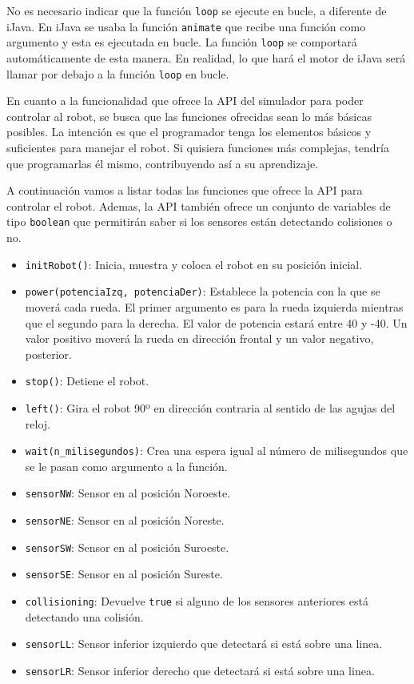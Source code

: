 No es necesario indicar que la función \texttt{loop} se ejecute en bucle, a diferente de iJava. En iJava se usaba la función \texttt{animate} que recibe una función como argumento y esta es ejecutada en bucle. La función \texttt{loop} se comportará automáticamente de esta manera. En realidad, lo que hará el motor de iJava será llamar por debajo a la función \texttt{loop} en bucle.






En cuanto a la funcionalidad que ofrece la API del simulador para poder controlar al robot, se busca que las funciones ofrecidas sean lo más básicas posibles. La intención es que el programador tenga los elementos básicos y suficientes para manejar el robot. Si quisiera funciones más complejas, tendría que programarlas él mismo, contribuyendo así a su aprendizaje. 

A continuación vamos a listar todas las funciones que ofrece la API para controlar el robot. Ademas, la API también ofrece un conjunto de variables de tipo \texttt{boolean} que permitirán saber si los sensores están detectando colisiones o no.

\begin{itemize}
	\item \texttt{initRobot()}: Inicia, muestra y coloca el robot en su posición inicial.
	\item \texttt{power(potenciaIzq, potenciaDer)}: Establece la potencia con la que se moverá cada rueda. El primer argumento es para la rueda izquierda mientras que el segundo para la derecha. El valor de potencia estará entre 40 y -40. Un valor positivo moverá la rueda en dirección frontal y un valor negativo, posterior.
	\item \texttt{stop()}: Detiene el robot.
	\item \texttt{left()}: Gira el robot 90º en dirección contraria al sentido de las agujas del reloj.
	\item \texttt{wait(n\_milisegundos)}: Crea una espera igual al número de milisegundos que se le pasan como argumento a la función. 
	\item \texttt{sensorNW}: Sensor en al posición Noroeste.
		\item \texttt{sensorNE}: Sensor en al posición Noreste.
			\item \texttt{sensorSW}: Sensor en al posición Suroeste.
				\item \texttt{sensorSE}: Sensor en al posición Sureste.
		\item \texttt{collisioning}: Devuelve \texttt{true} si alguno de los sensores anteriores está detectando una colisión.
			\item \texttt{sensorLL}: Sensor inferior izquierdo que detectará si está sobre una linea.
						\item \texttt{sensorLR}: Sensor inferior derecho que detectará si está sobre una linea.
\end{itemize}

